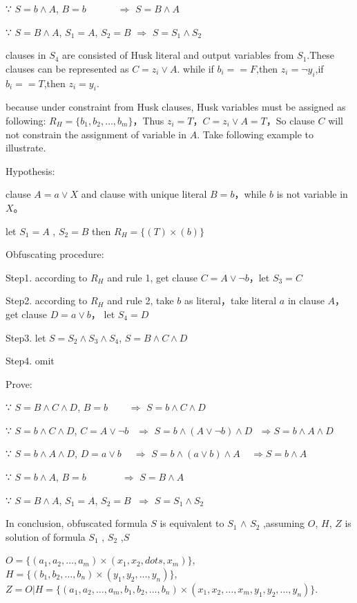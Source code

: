 \documentclass[runningheads,a4paper]{llncs}
\begin{document}
∵ $S=b\wedge A$, $B=b$ $~~~~~~~~~~~~~\Longrightarrow$ $S=B\wedge A$

∵ $S=B\wedge A$, $S_1 =A$, $S_2=B$ $\Longrightarrow$ $S=S_1\wedge S_2$ 

clauses in $S_4$ are consisted of Husk literal and output variables from $S_1$.These clauses can be represented as $C= z_i\vee A$. while if $b_i==F$,then $z_i= \neg y_i$,if $b_i ==T$,then $z_i =y_i$.

because under constraint from Husk clauses, Husk variables  must be assigned as following: 
$R_H=\{b_1,b_2,\dots,b_m\}$，Thus $z_i=T$，$C=z_i\vee A=T$，So clause $C$ will not constrain the assignment of variable in $A$.
Take following example to illustrate.

\noindent Hypothesis: 

clause $A=a\vee X$ and clause with unique literal $B=b$，while $b$ is not variable in $X$。

let $S_1=A$ , $S_2=B$  then $R_H=\{(T)\times(b)\}$ 

\noindent Obfuscating procedure:

Step1. according to $R_H$ and rule 1, get clause $C=A\vee \neg b$，let $S_3=C$

Step2. according to $R_H$ and rule 2, take $b$ as literal，take literal $a$ in clause $A$，get clause $D=a\vee b$， let $S_4=D$

Step3. let $S=S_2 \wedge S_3\wedge S_4$, $S=B\wedge C\wedge D$

Step4. omit

\noindent Prove:

∵ $S=B\wedge C\wedge D$, $B=b$ $~~~~~~~~\Longrightarrow$ $S=b\wedge C\wedge D$

∵ $S=b\wedge C\wedge D$, $C=A\vee \neg b$ $~~\Longrightarrow$ $S=b\wedge (A\vee \neg b)\wedge D ~~~\Longrightarrow S=b\wedge A\wedge D$

∵ $S=b\wedge A\wedge D$,  $D=a\vee b$  $~~~~\Longrightarrow$ $S=b\wedge (a\vee b)\wedge A ~~~~~\Longrightarrow S=b\wedge A$

∵ $S=b\wedge A$, $B=b$  $~~~~~~~~~~~~~~~\Longrightarrow$ $S= B\wedge A$ 

∵ $S=B\wedge A$,    $S_1=A$,  $S_2=B$   $~\Longrightarrow$ $S= S_1\wedge S_2$ 

In conclusion, obfuscated formula $S$ is equivalent to $S_1$ $\wedge$  $S_2$ ,assuming $O$, $H$, $Z$ is solution of formula $S_1$ , $S_2$ ,$S$ 

$O=\{(a_1,a_2,\dots,a_m)\times(x_1,x_2,dots,x_m)\}$, $H=\{(b_1,b_2,\dots,b_n)\times(y_1,y_2,\dots,y_n)\}$, 
$Z=O|H=\{(a_1,a_2,\dots,a_m,b_1,b_2,\dots,b_n)\times(x_1,x_2,\dots,x_m,y_1,y_2,\dots,y_n)\}$.
\end{document}
